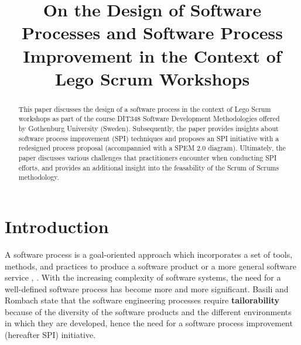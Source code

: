 \documentclass[conference]{IEEEtran}
\begin{document}
\title{On the Design of Software Processes and Software Process Improvement in
the Context of Lego Scrum Workshops}

\author{
}

\maketitle

\begin{abstract}
This paper discusses the design of a software process in the context of Lego
Scrum workshops as part of the course DIT348 Software Development Methodologies
offered by Gothenburg University (Sweden). Subsequently, the paper provides
insights about software process improvement (SPI) techniques and proposes an
SPI initiative with a redesigned process proposal (accompannied with a SPEM 2.0
diagram). Ultimately, the paper discusses various challenges that practitioners
encounter when conducting SPI efforts, and provides an additional insight into
the feasability of the Scrum of Scrums methodology.
\end{abstract}

\section{Introduction}


A software process is a goal-oriented approach which incorporates a set of
tools, methods, and practices to produce a software product or a more general
software service \cite{Munch2012}, \cite{Humphrey1989}. With the increasing
complexity of software systems, the need for a well-defined software process
has become more and more significant. Basili and Rombach \cite{Basili1988}
state that the software engineering processes require \textbf{tailorability}
because of the diversity of the software products and the different
environments in which they are developed, hence the need for a software process
improvement (hereafter SPI) initiative.
\end{document}
